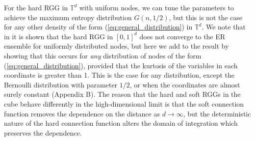 \documentclass{article}
\newcommand{\tti}{\rightarrow\infty}
\begin{document}
For the hard RGG in $\mathbb{T}^d$ with uniform nodes, we can tune the parameters to achieve the maximum entropy distribution $G(n,1/2)$, but this is not the case for any other density of the form (\ref{eq:general_distribution}) in $\mathbb{T}^d$. We note that in \cite{erba2020random} it is shown that the hard RGG in $[0,1]^d$ does not converge to the ER ensemble for uniformly distributed nodes, but here we add to the result by showing that this occurs for \textit{any} distribution of nodes of the form (\ref{eq:general_distribution}), provided that the kurtosis of the variables in each coordinate is greater than 1. This is the case for any distribution, except the Bernoulli distribution with parameter $1/2$, or when the coordinates are almost surely constant (Appendix B). The reason that the hard and soft RGGs in the cube behave differently in the high-dimensional limit is that the soft connection function removes the dependence on the distance as $d\tti$, but the deterministic nature of the hard connection function alters the domain of integration which preserves the dependence.
\end{document}
